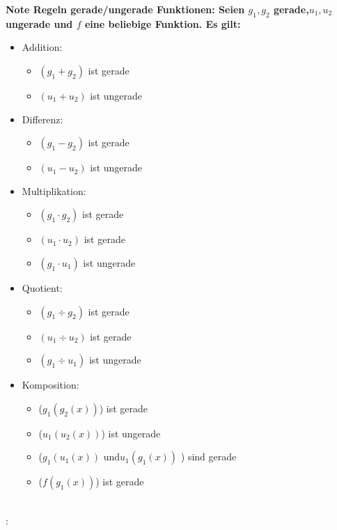 \documentclass[7pt,landscape, margin = 0.1mm]{article}
\newcommand{\KRZ}[2]{\vspace{1mm} \hline \vspace{1mm} \color{chaptercolor}{RC #1}:\color{black} \   \hspace{0.2cm}\vspace{1mm}   {\begin{minipage}{20em}
#2 \end{minipage}} \vspace{1mm}  \hline \vspace{1mm}  \\}
\newcommand{\NOTE}[2]{\color{chaptercolor}\bf{Note #1}:\color{black}    \hspace{0.2cm} #2 \\}
\begin{document}
\begin{multicols}{4}
\begin{flushleft}
{}
\NOTE{Regeln gerade/ungerade Funktionen}{
Seien $g_1,g_2$ gerade,$u_1,u_2$ ungerade und $f$ eine beliebige Funktion.  Es gilt:
\begin{itemize}
\item Addition:
\begin{itemize}
\item $(g_1+g_2)$ ist gerade
\item $(u_1+u_2)$ ist ungerade
\end{itemize}
\item Differenz:
\begin{itemize}
\item $(g_1-g_2)$ ist gerade
\item $(u_1-u_2)$ ist ungerade
\end{itemize}
\item Multiplikation:
\begin{itemize}
\item $(g_1 \cdot g_2)$ ist gerade
\item $(u_1 \cdot u_2)$ ist gerade
\item $(g_1 \cdot u_1)$ ist ungerade
\end{itemize}
\item Quotient:
\begin{itemize}
\item $(g_1 \div g_2)$ ist gerade
\item $(u_1 \div u_2)$ ist gerade
\item $(g_1 \div u_1)$ ist ungerade
\end{itemize}
\item Komposition:
\begin{itemize}
\item ($ g_1(g_2(x)) $) ist gerade 
\item ($ u_1(u_2(x)) $) ist ungerade 
\item ($ g_1(u_1(x))$ und$ u_1(g_1(x)) $ ) sind gerade 
\item ($ f(g_1(x)) $) ist gerade 
\end{itemize}
\end{itemize}}


\KRZ{Eigenschaften Kurzfassung}{

\begin{center}



\end{center}}
\end{flushleft}
\end{multicols}
\end{document}
